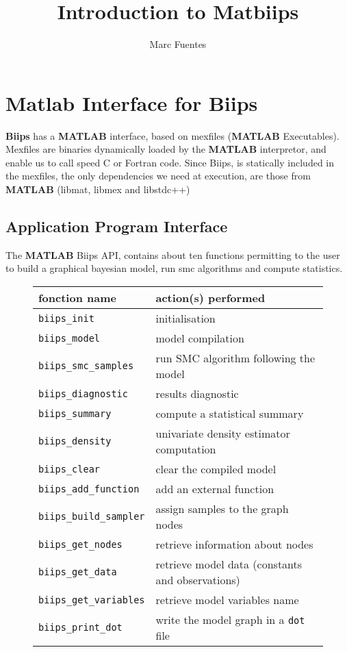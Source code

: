 \documentclass[11pt,twoside]{article}
\newcommand{\biips}{{\bf Biips}{}}
\newcommand{\matlab}{{\bf MATLAB}{}}
\begin{document}
\title{Introduction to Matbiips}
\author{Marc Fuentes}
\date{}

\maketitle
\tableofcontents


\section{Matlab Interface for \biips}

  \biips{} has a \matlab{} interface, based on mexfiles (\matlab{} Executables). Mexfiles are binaries dynamically loaded by the \matlab{} interpretor, and
  enable us to call speed C or Fortran code. Since Biips, is statically included in the mexfiles, the only dependencies we need at execution, 
  are those from \matlab{} (libmat, libmex and libstdc++)
  

  \subsection{Application Program Interface}

   The \matlab{} Biips API, contains about ten functions permitting to the user to build a graphical bayesian model, run smc algorithms
   and compute statistics.

  \begin{figure}[H]
  \begin{tabular}{|l|l|}
  \hline
   fonction name &  action(s) performed \\
  \hline
   \texttt{biips\_init} & initialisation \\
   \texttt{biips\_model} & model compilation \\
   \texttt{biips\_smc\_samples} & run SMC algorithm following the model \\
   \texttt{biips\_diagnostic} & results diagnostic \\
   \texttt{biips\_summary} & compute a statistical summary \\ 
   \texttt{biips\_density} & univariate density estimator computation \\ 
   \texttt{biips\_clear} & clear the compiled model \\
  \hline
   \texttt{biips\_add\_function} & add an external function \\
   \texttt{biips\_build\_sampler} & assign samples to the graph nodes \\ 
   \texttt{biips\_get\_nodes} & retrieve information about nodes \\ 
   \texttt{biips\_get\_data} & retrieve model data (constants and observations) \\
   \texttt{biips\_get\_variables} & retrieve model variables name \\ 
   \texttt{biips\_print\_dot} & write the model graph in a \texttt{dot} file\\
   \hline
  \end{tabular}
  \end{figure}
\end{document}
